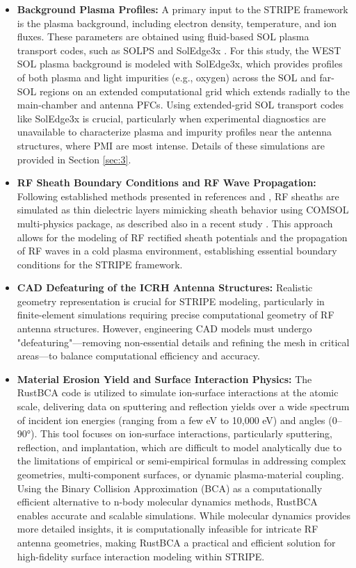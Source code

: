 \documentclass[10pt]{iopart}
\begin{document}
\begin{itemize}
    \item \textbf{Background Plasma Profiles:} A primary input to the STRIPE framework is the plasma background, including electron density,  temperature, and ion fluxes. These parameters are obtained using fluid-based SOL plasma transport codes, such as SOLPS \cite{Schneider:2006, Islam:2023} and SolEdge3x \cite{Bufferand_2015, Ciraolo_2019}. For this study, the WEST SOL plasma background is modeled with SolEdge3x, which provides profiles of both plasma and light impurities (e.g., oxygen) across the SOL and far-SOL regions on an extended computational grid which extends radially to the main-chamber and antenna PFCs. Using extended-grid SOL transport codes like SolEdge3x is crucial, particularly when experimental diagnostics are unavailable to characterize plasma and impurity profiles near the antenna structures, where PMI are most intense. Details of these simulations are provided in Section \ref{sec:3}.
    
    \item \textbf{RF Sheath Boundary Conditions and RF Wave Propagation:} Following established methods presented in references  and , RF sheaths are simulated as thin dielectric layers mimicking sheath behavior using COMSOL multi-physics package, as described also in a recent study \cite{Tierens_2024}. This approach allows for the modeling of RF rectified sheath potentials and the propagation of RF waves in a cold plasma environment, establishing essential boundary conditions for the STRIPE framework.
    
    \item \textbf{CAD Defeaturing of the ICRH Antenna Structures:} Realistic geometry representation is crucial for STRIPE modeling, particularly in finite-element simulations requiring precise computational geometry of RF antenna structures. However, engineering CAD models must undergo "defeaturing"—removing non-essential details and refining the mesh in critical areas—to balance computational efficiency and accuracy.
    
    \item \textbf{Material Erosion Yield and Surface Interaction Physics:} The RustBCA code \cite{RustBCA, Drobny:2023} is utilized to simulate ion-surface interactions at the atomic scale, delivering data on sputtering and reflection yields over a wide spectrum of incident ion energies (ranging from a few eV to 10,000 eV) and angles (0–90°). This tool focuses on ion-surface interactions, particularly sputtering, reflection, and implantation, which are difficult to model analytically due to the limitations of empirical or semi-empirical formulas in addressing complex geometries, multi-component surfaces, or dynamic plasma-material coupling. Using the Binary Collision Approximation (BCA) as a computationally efficient alternative to n-body molecular dynamics methods, RustBCA enables accurate and scalable simulations. While molecular dynamics provides more detailed insights, it is computationally infeasible for intricate RF antenna geometries, making RustBCA a practical and efficient solution for high-fidelity surface interaction modeling within STRIPE.
    

\end{itemize}
\end{document}
